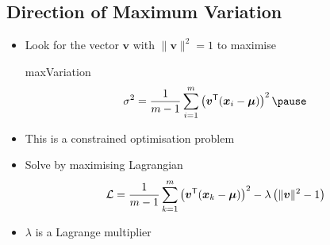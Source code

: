 \begin{slide}
\section{Direction of Maximum Variation}

\begin{PauseHighLight}
  \begin{itemize}
  \item Look for the vector $\bm{v}$ with $\|\bm{v}\|^2=1$ to maximise
    \begin{rightImage}{maxVariation}
    \begin{align*}
      \sigma^2 = \frac{1}{m-1} \sum_{i=1}^m \left( \bm{v}^\tr
      (\bm{x}_i-\bm{\mu}) \right)^2\pause
    \end{align*}
    \end{rightImage}
  \item This is a constrained optimisation problem\pause
  \item Solve by maximising Lagrangian
    \begin{align*}
      \mathcal{L} = \frac{1}{m-1} \sum_{k=1}^m \left( \bm{v}^{\textsf{T}}
      (\bm{x}_k-\bm{\mu}) \right)^2 - \lambda \left(\|\bm{v}\|^2-1\right)
    \end{align*}
  \item $\lambda$ is a Lagrange multiplier\pause
  \end{itemize}
\end{PauseHighLight}

\end{slide}



